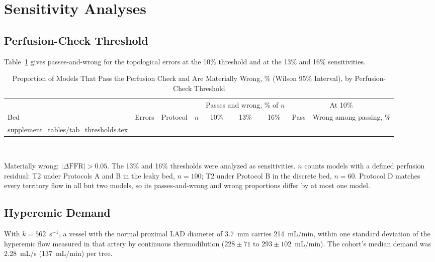 \documentclass[journal,twoside,web,onecolumn]{ieeecolor}
\begin{document}
\FloatBarrier
{}
\section{Sensitivity Analyses}
\subsection{Perfusion-Check Threshold}
Table~\ref{tab:thr} gives passes-and-wrong for the topological errors at the 10\% threshold and at the 13\% and 16\% sensitivities.
\begin{table}[!ht]
\caption{Proportion of Models That Pass the Perfusion Check and Are Materially Wrong, \% (Wilson 95\% Interval), by
Perfusion-Check Threshold}\label{tab:thr}
\centering\footnotesize
\begin{tabular}{@{}lllrcccrc@{}}
\toprule
 & & & & \multicolumn{3}{c}{Passes and wrong, \% of $n$} & \multicolumn{2}{c}{At 10\%}\\
\cmidrule(lr){5-7}\cmidrule(l){8-9}
Bed & Errors & Protocol & $n$ & 10\% & 13\% & 16\% & Pass & Wrong among passing, \%\\
\midrule
{} supplement_tables/tab_thresholds.tex 
\bottomrule
\end{tabular}
\\[3pt]
\parbox{0.85\textwidth}{\footnotesize Materially wrong: $|\Delta\mathrm{FFR}| > 0.05$. The 13\% and 16\% thresholds were analyzed as sensitivities. $n$ counts models with a
defined perfusion residual: T2 under Protocols A and B in the leaky bed, $n = 100$; T2 under Protocol B in the
discrete bed, $n = 60$. Protocol D matches every territory flow in all but two models, so its passes-and-wrong and wrong proportions differ by at most one model.}
\end{table}

\FloatBarrier
{}
\subsection{Hyperemic Demand}\label{sec:demand}
With $k = 562$~s$^{-1}$, a vessel with the normal proximal LAD diameter of 3.7~mm carries 214~mL/min, within one standard deviation of the hyperemic flow measured in that artery by continuous thermodilution ($228 \pm 71$ to $293 \pm 102$~mL/min). The cohort's median demand was 2.28~mL/s (137~mL/min) per tree.


\FloatBarrier
{}
\end{document}
